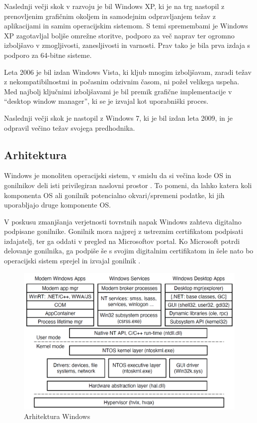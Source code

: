 \documentclass[a4paper,12pt,openright]{book}
\begin{document}
Naslednji večji skok v razvoju je bil Windows XP, ki je na trg nastopil z prenovljenim grafičnim okoljem in samodejnim odpravljanjem težav z aplikacijami in samim operacijskim sistemom.
S temi spremembami je Windows XP zagotavljal boljše omrežne storitve, podporo za več naprav ter ogromno izboljšavo v zmogljivosti, zanesljivosti in varnosti.
Prav tako je bila prva izdaja s podporo za 64-bitne sisteme.

Leta 2006 je bil izdan Windows Vista, ki kljub mnogim izboljšavam, zaradi težav z nekompatibilnostmi in počasnim odzivnim časom, ni požel velikega uspeha.
Med najbolj ključnimi izboljšavami je bil premik grafične implementacije v ``desktop window manager'', ki se je izvajal kot uporabniški proces.

Naslednji večji skok je nastopil z Windows 7, ki je bil izdan leta 2009, in je odpravil večino težav svojega predhodnika.

\subsection{Arhitektura} \label{ssec:windows:architecture}

Windows je monoliten operacijski sistem, v smislu da si večina kode OS in gonilnikov deli isti privilegiran naslovni prostor \cite{Yosifovich_Russinovich_Solomon_Ionescu_2017}.
To pomeni, da lahko katera koli komponenta OS ali gonilnik potencialno okvari/spremeni podatke, ki jih uporabljajo druge komponente OS.

V poskusu zmanjšanja verjetnosti tovrstnih napak Windows zahteva digitalno podpisane gonilnike.
Gonilnik mora najprej z ustreznim certifikatom podpisati izdajatelj, ter ga oddati v pregled na Microsoftov portal.
Ko Microsoft potrdi delovanje gonilnika, ga podpiše še s svojim digitalnim certifikatom in šele nato bo operacijski sistem sprejel in izvajal gonilnik \cite{Yosifovich_Russinovich_Solomon_Ionescu_2017}.

\begin{figure}[h!]
	\begin{center}
		\includegraphics[width=\textwidth]{images/windows_programming_layers.png}
	\end{center}
	\caption{Arhitektura Windows \cite{Tanenbaum_Bos_2023}}
	\label{fig:windows_architecture}
\end{figure}
\end{document}
